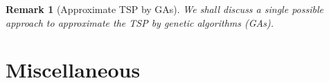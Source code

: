 \documentclass{article}
\newtheorem{remark}{Remark}
\begin{document}
\begin{remark}[Approximate TSP by GAs]
	We shall discuss a single possible approach to approximate the TSP by genetic algorithms (GAs).
\end{remark}


\section{Miscellaneous}


\printbibliography[heading=bibintoc]
	
\end{document}
